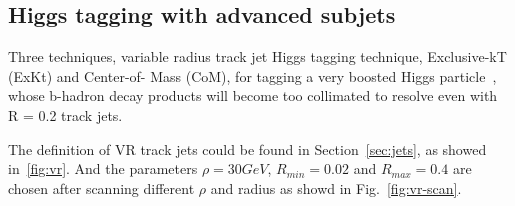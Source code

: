 \subsection{Higgs tagging with advanced subjets}

\par Three techniques, variable radius track jet Higgs tagging technique, Exclusive-kT (ExKt) and Center-of- Mass (CoM), for tagging a very boosted Higgs 
particle~\cite{ATL-PHYS-PUB-2017-010}, 
whose b-hadron decay products will become too collimated to resolve even with R = 0.2 track jets.
\par The definition of VR track jets could be found in Section~\ref{sec:jets}, as showed in~\ref{fig:vr}. And the parameters $\rho = 30 GeV$, $R_{min} = 0.02$ and $R_{max} = 0.4$ 
are chosen after scanning different $\rho$ and radius as showd in Fig.~\ref{fig:vr-scan}.


